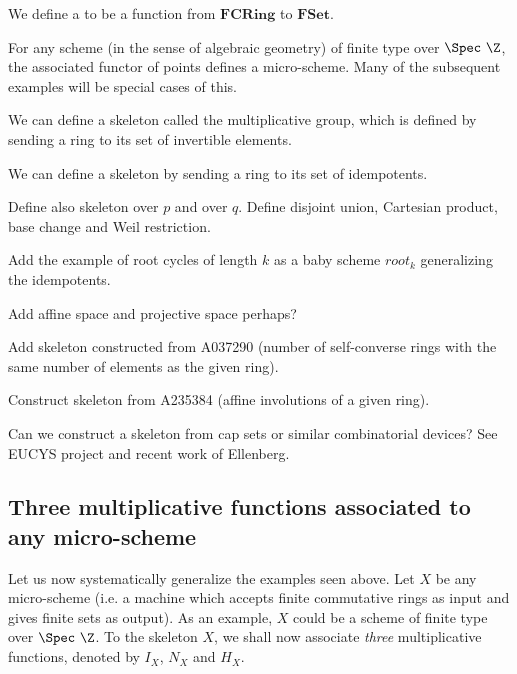\documentclass[a4paper]{article}
\begin{document}
\begin{definition}
We define a  to be a function from $\mathbf{FCRing}$ to $\mathbf{FSet}$.
\end{definition}

\begin{example}
For any scheme (in the sense of algebraic geometry) of finite type over $\Spec \ \Z$, the associated functor of points defines a micro-scheme. Many of the subsequent examples will be special cases of this.
\end{example}

\begin{example}
We can define a skeleton called the multiplicative group, which is defined by sending a ring to its set of invertible elements.
\end{example}


\begin{example}
We can define a skeleton by sending a ring to its set of idempotents.
\end{example}



Define also skeleton over $p$ and over $q$. Define disjoint union, Cartesian product, base change and Weil restriction.

Add the example of root cycles of length $k$ as a baby scheme $root_k$ generalizing the idempotents.

Add affine space and projective space perhaps?

Add skeleton constructed from A037290 (number of self-converse rings with the same number of elements as the given ring). 

Construct skeleton from A235384 (affine involutions of a given ring). 

Can we construct a skeleton from cap sets or similar combinatorial devices? See EUCYS project and recent work of Ellenberg. 


\subsection{Three multiplicative functions associated to any micro-scheme}



Let us now systematically generalize the examples seen above. Let $X$ be any micro-scheme (i.e. a machine which accepts finite commutative rings as input and gives finite sets as output). As an example, $X$ could be a scheme of finite type over $\Spec \ \Z$. To the skeleton $X$, we shall now associate \emph{three} multiplicative functions, denoted by $I_X$, $N_X$ and $H_X$.
\end{document}
